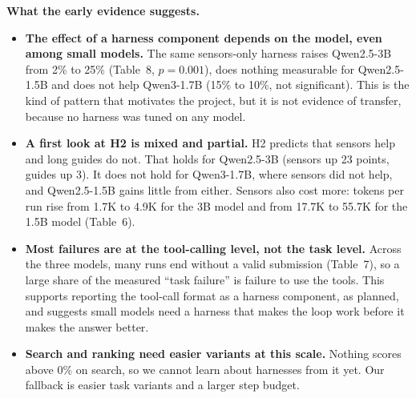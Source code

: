 \documentclass[11pt]{article}
\begin{document}
\textbf{What the early evidence suggests.}
\begin{itemize}
  \item \textbf{The effect of a harness component depends on the model, even among small models.} The same sensors-only harness raises Qwen2.5-3B from 2\% to 25\% (Table~8, $p=0.001$), does nothing measurable for Qwen2.5-1.5B and does not help Qwen3-1.7B (15\% to 10\%, not significant). This is the kind of pattern that motivates the project, but it is not evidence of transfer, because no harness was tuned on any model.
  \item \textbf{A first look at H2 is mixed and partial.} H2 predicts that sensors help and long guides do not. That holds for Qwen2.5-3B (sensors up 23 points, guides up 3). It does not hold for Qwen3-1.7B, where sensors did not help, and Qwen2.5-1.5B gains little from either. Sensors also cost more: tokens per run rise from 1.7K to 4.9K for the 3B model and from 17.7K to 55.7K for the 1.5B model (Table~6).
  \item \textbf{Most failures are at the tool-calling level, not the task level.} Across the three models, many runs end without a valid submission (Table~7), so a large share of the measured ``task failure'' is failure to use the tools. This supports reporting the tool-call format as a harness component, as planned, and suggests small models need a harness that makes the loop work before it makes the answer better.
  \item \textbf{Search and ranking need easier variants at this scale.} Nothing scores above 0\% on search, so we cannot learn about harnesses from it yet. Our fallback is easier task variants and a larger step budget.
\end{itemize}
\end{document}

